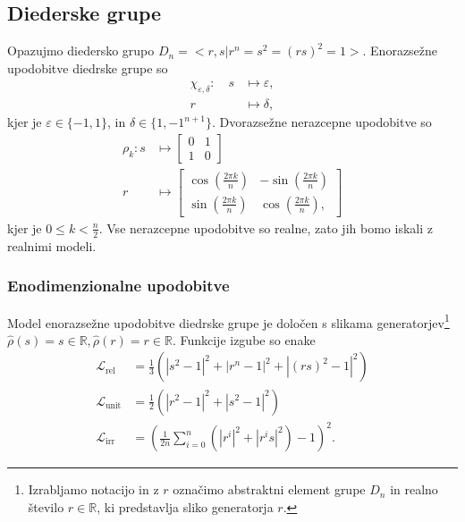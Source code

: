 \documentclass[mat2, tisk]{fmfdelo}
\newcommand{\R}{\mathbb R}
\newcommand{\Loss}[1]{\mathcal L _\text{#1}}
\begin{document}
    \subsection{Diederske grupe}
    Opazujmo diedersko grupo $D_n = <r, s|r^n=s^2 = (rs)^2 = 1>$. Enorazsežne upodobitve diedrske grupe so
            \begin{align*}
            \chi_{\varepsilon, \delta} \colon \quad 
            s &\mapsto \varepsilon, \\
            r &\mapsto \delta,
        \end{align*}
        kjer je  \( \varepsilon \in \{-1, 1\} \), in $\delta \in \{1, -1^{n + 1}\}$.
Dvorazsežne nerazcepne upodobitve so 
         \begin{align*}
            \rho_k \colon  s &\mapsto \begin{bmatrix}
                0 & 1 \\
                1 & 0
            \end{bmatrix}\\
            r &\mapsto \begin{bmatrix}
                \cos\left(\frac{2\pi k}{n}\right) & -\sin\left(\frac{2\pi k}{n}\right) \\
                \sin\left(\frac{2\pi k}{n}\right) & \cos\left(\frac{2\pi k}{n}\right),
            \end{bmatrix}
        \end{align*}
        kjer je $0 \leq k < \frac{n}{2} $. Vse nerazcepne upodobitve so realne, zato jih bomo iskali z realnimi modeli.
        \subsubsection{Enodimenzionalne upodobitve}
        Model enorazsežne upodobitve diedrske grupe 
        je določen s slikama generatorjev\footnote{Izrabljamo notacijo in z $r$ označimo abstraktni element grupe $D_n$ in realno število $r \in \R$, ki predstavlja sliko generatorja $r$.}
        $\hat \rho(s) = s \in \R, \hat \rho(r)=r \in \R$. Funkcije izgube so enake
        \begin{align*}
            \Loss{rel} &= \frac{1}{3} \left( |s^2 -1|^2 + |r^n -1|^2  + |(rs)^2 -1|^2  \right )\\
            \Loss{unit} &=  \frac{1}{2} \left ( |r^2 -1|^2 + |s ^2 -1|^2  \right)  \\
            \Loss{irr} &= \left ( \frac{1}{2n}\sum_{i=0}^n(|r^i|^2 + |r^is|^2)    - 1\right )^2.
        \end{align*}
\end{document}
